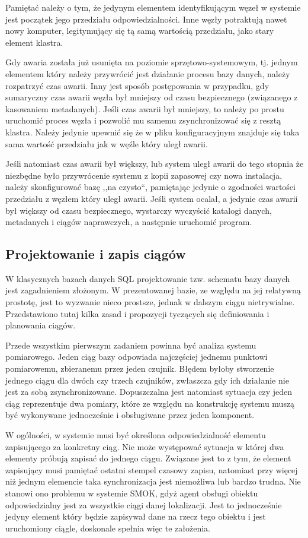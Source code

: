 \documentclass[a4paper,polish,12pt,twoside]{article}
\begin{document}
Pamiętać należy o tym, że jedynym elementem identyfikującym węzeł w systemie jest początek jego przedziału odpowiedzialności. Inne węzły potraktują nawet nowy komputer, legitymujący się tą samą wartością przedziału, jako stary element klastra.

Gdy awaria została już usunięta na poziomie sprzętowo-systemowym, tj. jednym elementem który należy przywrócić jest działanie procesu bazy danych, należy rozpatrzyć czas awarii. Inny jest sposób postępowania w przypadku, gdy sumaryczny czas awarii węzła był mniejszy od czasu bezpiecznego (związanego z kasowaniem metadanych). Jeśli czas awarii był mniejszy, to należy po prostu uruchomić proces węzła i pozwolić mu samemu zsynchronizować się z resztą klastra. Należy jedynie upewnić się że w pliku konfiguracyjnym znajduje się taka sama wartość przedziału jak w węźle który uległ awarii.

Jeśli natomiast czas awarii był większy, lub system uległ awarii do tego stopnia że niezbędne było przywrócenie systemu z kopii zapasowej czy nowa instalacja, należy skonfigurować bazę ,,na czysto``, pamiętając jedynie o zgodności wartości przedziału z węzłem który uległ awarii. Jeśli system ocalał, a jedynie czas awarii był większy od czasu bezpiecznego, wystarczy wyczyścić katalogi danych, metadanych i ciągów naprawczych, a następnie uruchomić program.

		\subsection{Projektowanie i zapis ciągów}
		\label{sec:one_client_one_series}
W klasycznych bazach danych SQL projektowanie tzw. schematu bazy danych jest zagadnieniem złożonym. W prezentowanej bazie, ze względu na jej relatywną prostotę, jest to wyzwanie nieco prostsze, jednak w dalszym ciągu nietrywialne. Przedstawiono tutaj kilka zasad i propozycji tyczących się definiowania i planowania ciągów.

Przede wszystkim pierwszym zadaniem powinna być analiza systemu pomiarowego. Jeden ciąg bazy odpowiada najczęściej jednemu punktowi pomiarowemu, zbieranemu przez jeden czujnik. Błędem byłoby stworzenie jednego ciągu dla dwóch czy trzech czujników, zwłaszcza gdy ich działanie nie jest za sobą zsynchronizowane. Dopuszczalna jest natomiast sytuacja czy jeden ciąg reprezentuje dwa pomiary, które ze względu na konstrukcję systemu muszą być wykonywane jednocześnie i obsługiwane przez jeden komponent.
	
W ogólności, w systemie musi być określona odpowiedzialność elementu zapisującego za konkretny ciąg. Nie może występować sytuacja w której dwa elementy próbują zapisać do jednego ciągu. Związane jest to z tym, że element zapisujący musi pamiętać ostatni stempel czasowy zapisu, natomiast przy więcej niż jednym elemencie taka synchronizacja jest niemożliwa lub bardzo trudna. Nie stanowi ono problemu w systemie SMOK, gdyż agent obsługi obiektu odpowiedzialny jest za wszystkie ciągi danej lokalizacji. Jest to jednocześnie jedyny element który będzie zapisywał dane na rzecz tego obiektu i jest uruchomiony ciągle, doskonale spełnia więc te założenia.
\end{document}
